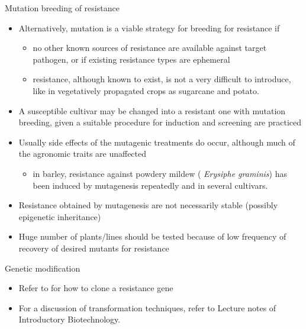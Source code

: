 \documentclass[11pt,dvipsnames,ignorenonframetext,aspectratio=169]{beamer}
\providecommand{\tightlist}{%
  \setlength{\itemsep}{0pt}\setlength{\parskip}{0pt}}
\begin{document}
\begin{frame}{Mutation breeding of resistance}
\protect\hypertarget{mutation-breeding-of-resistance}{}
\begin{itemize}
\tightlist
\item
  Alternatively, mutation is a viable strategy for breeding for
  resistance if

  \begin{itemize}
  \tightlist
  \item
    no other known sources of resistance are available against target
    pathogen, or if existing resistance types are ephemeral
  \item
    resistance, although known to exist, is not a very difficult to
    introduce, like in vegetatively propagated crops as sugarcane and
    potato.
  \end{itemize}
\item
  A susceptible cultivar may be changed into a resistant one with
  mutation breeding, given a suitable procedure for induction and
  screening are practiced
\item
  Usually side effects of the mutagenic treatments do occur, although
  much of the agronomic traits are unaffected

  \begin{itemize}
  \tightlist
  \item
    in barley, resistance against powdery mildew ( \emph{Erysiphe
    graminis}) has been induced by mutagenesis repeatedly and in several
    cultivars.
  \end{itemize}
\item
  Resistance obtained by mutagenesis are not necessarily stable
  (possibly epigenetic inheritance)
\item
  Huge number of plants/lines should be tested because of low frequency
  of recovery of desired mutants for resistance
\end{itemize}
\end{frame}

\begin{frame}{Genetic modification}
\protect\hypertarget{genetic-modification}{}
\begin{itemize}
\tightlist
\item
  Refer to \citet{pavan2008map} for how to clone a resistance gene
\item
  For a discussion of transformation techniques, refer to Lecture notes
  of Introductory Biotechnology.
\end{itemize}
\end{frame}
\end{document}
